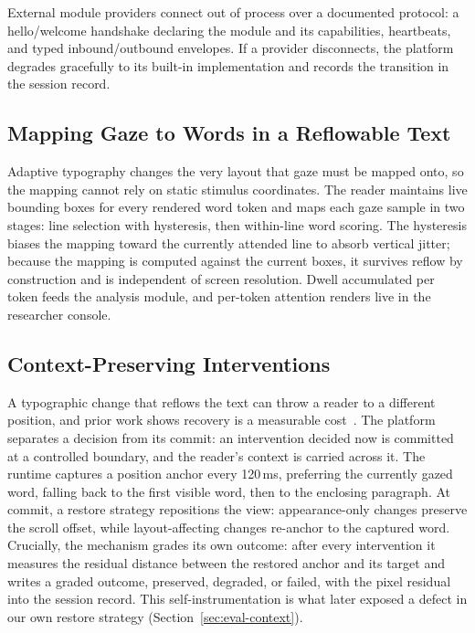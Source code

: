 External module providers connect out of process over a documented protocol: a hello/welcome handshake declaring the module and its capabilities, heartbeats, and typed inbound/outbound envelopes.
If a provider disconnects, the platform degrades gracefully to its built-in implementation and records the transition in the session record.

\subsection{Mapping Gaze to Words in a Reflowable Text}

Adaptive typography changes the very layout that gaze must be mapped onto, so the mapping cannot rely on static stimulus coordinates.
The reader maintains live bounding boxes for every rendered word token and maps each gaze sample in two stages: line selection with hysteresis, then within-line word scoring.
The hysteresis biases the mapping toward the currently attended line to absorb vertical jitter; because the mapping is computed against the current boxes, it survives reflow by construction and is independent of screen resolution.
Dwell accumulated per token feeds the analysis module, and per-token attention renders live in the researcher console.

\subsection{Context-Preserving Interventions}
\label{sec:context-preservation}

A typographic change that reflows the text can throw a reader to a different position, and prior work shows recovery is a measurable cost~\cite{jensen2025context}.
The platform separates a decision from its commit: an intervention decided now is committed at a controlled boundary, and the reader's context is carried across it.
The runtime captures a position anchor every 120\,ms, preferring the currently gazed word, falling back to the first visible word, then to the enclosing paragraph.
At commit, a restore strategy repositions the view: appearance-only changes preserve the scroll offset, while layout-affecting changes re-anchor to the captured word.
Crucially, the mechanism grades its own outcome: after every intervention it measures the residual distance between the restored anchor and its target and writes a graded outcome, preserved, degraded, or failed, with the pixel residual into the session record.
This self-instrumentation is what later exposed a defect in our own restore strategy (Section~\ref{sec:eval-context}).


